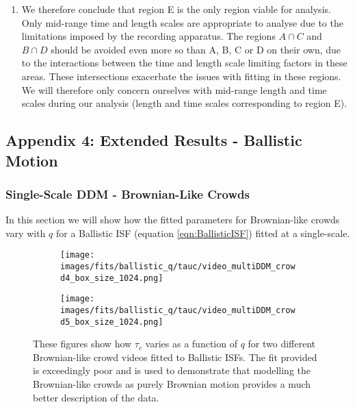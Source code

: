 \documentclass[10pt]{article}
\begin{document}
\begin{enumerate}[label=(\Alph*)]
\item We therefore conclude that region E is the only region viable for analysis. Only mid-range time and length scales are appropriate to analyse due to the limitations imposed by the recording apparatus. The regions $A \cap C$ and $B \cap D$ should be avoided even more so than A, B, C or D on their own, due to the interactions between the time and length scale limiting factors in these areas. These intersections exacerbate the issues with fitting in these regions. We will therefore only concern ourselves with mid-range length and time scales during our analysis (length and time scales corresponding to region E).
\end{enumerate}

\subsection{Appendix 4: Extended Results - Ballistic Motion}
\label{section:ballistic_motion_results}

\subsubsection{Single-Scale DDM - Brownian-Like Crowds}
In this section we will show how the fitted parameters for Brownian-like crowds vary with $q$ for a Ballistic ISF (equation \ref{eqn:BallisticISF}) fitted at a single-scale.

\begin{figure}[H]
\begin{subfigure}[t]{.5\textwidth}
  \centering
  \texttt{[image: images/fits/ballistic\_q/tauc/video\_multiDDM\_crowd4\_box\_size\_1024.png]}
  \caption{}
\end{subfigure}%
\hfill
\begin{subfigure}[t]{.5\textwidth}
  \centering
  \texttt{[image: images/fits/ballistic\_q/tauc/video\_multiDDM\_crowd5\_box\_size\_1024.png]}
  \caption{}
\end{subfigure}
\caption{These figures show how $\tau_c$ varies as a function of $q$ for two different Brownian-like crowd videos fitted to Ballistic ISFs. The fit provided is exceedingly poor and is used to demonstrate that modelling the Brownian-like crowds as purely Brownian motion provides a much better description of the data.}
\label{fig:crowd_ballistic_fits_tauc}
\end{figure}
\end{document}

